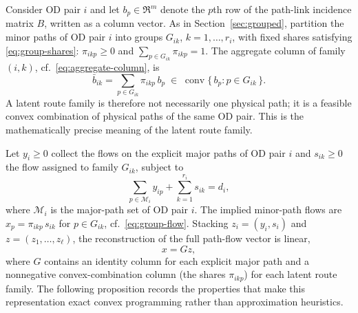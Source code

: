 Consider OD pair $i$ and let $b_p \in \Re^m$ denote the $p$th row of the
path-link incidence matrix $B$, written as a column vector. As in
Section~\ref{sec:grouped}, partition the minor paths of OD pair $i$ into
groups $G_{ik}$, $k = 1, \dots, r_i$, with fixed shares satisfying
\eqref{eq:group-shares}:
$\pi_{ikp} \ge 0$ and $\sum_{p \in G_{ik}} \pi_{ikp} = 1$.
The aggregate column of family $(i,k)$, cf.\ \eqref{eq:aggregate-column}, is
\begin{equation}
\label{eq:family-hull}
\bar b_{ik} = \sum_{p \in G_{ik}} \pi_{ikp}\, b_p
\;\in\;
\operatorname{conv}\bigl\{\, b_p : p \in G_{ik} \,\bigr\}.
\end{equation}
A latent route family is therefore not necessarily one physical path; it is a
feasible convex combination of physical paths of the same OD pair. This is the
mathematically precise meaning of the latent route family.

Let $y_i \ge 0$ collect the flows on the explicit major paths of OD pair $i$
and $s_{ik} \ge 0$ the flow assigned to family $G_{ik}$, subject to
\begin{equation}
\label{eq:z-simplex}
\sum_{p \in \mathcal M_i} y_{ip} + \sum_{k=1}^{r_i} s_{ik} = d_i ,
\end{equation}
where $\mathcal M_i$ is the major-path set of OD pair $i$. The implied
minor-path flows are $x_p = \pi_{ikp}\, s_{ik}$ for $p \in G_{ik}$, cf.\
\eqref{eq:group-flow}. Stacking $z_i = (y_i, s_i)$ and $z = (z_1, \dots,
z_\ell)$, the reconstruction of the full path-flow vector is linear,
\begin{equation}
\label{eq:G-reconstruction}
x = G z ,
\end{equation}
where $G$ contains an identity column for each explicit major path and a
nonnegative convex-combination column (the shares $\pi_{ikp}$) for each latent
route family. The following proposition records the properties that make this
representation exact convex programming rather than approximation heuristics.

